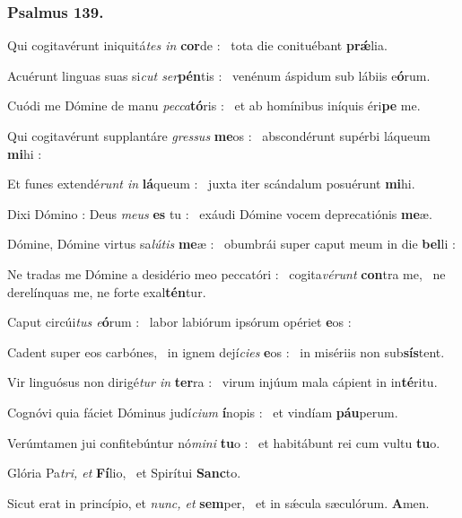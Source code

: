 \documentclass[12pt]{article} %
\def\noinitial{%
\setspaceafterinitial{0pt plus 0em minus 0em}%
\setspacebeforeinitial{0pt plus 0em minus 0em}%
\relax %
}
\newenvironment{psalmtext}{\leftskip 0.25in}{\vspace{2 mm}}
\let\oldgresixstar\gresixstar
\renewcommand{\gresixstar}{\textcolor{benred8}{\oldgresixstar}}
\let\oldgredagger\gredagger
\renewcommand{\gredagger}{\textcolor{benred8}{\oldgredagger}}
\begin{document}
\subsubsection*{Psalmus 139.}

{\noinitial
{}

}

\begin{psalmtext}
Qui cogitavérunt iniquitá\emph{tes in} \textbf{cor}de : \gresixstar\ tota die conituébant \textbf{prǽ}lia.

Acuérunt linguas suas si\emph{cut ser}\textbf{pén}tis : \gresixstar\ venénum áspidum sub lábiis e\textbf{ó}rum.

Cuódi me Dómine de manu \emph{pecca}\textbf{tó}ris : \gresixstar\ et ab homínibus iníquis éri\textbf{pe} me.

Qui cogitavérunt supplantáre \emph{gressus} \textbf{me}os : \gresixstar\ abscondérunt supérbi láqueum \textbf{mi}hi :

Et funes extendé\emph{runt in} \textbf{lá}queum : \gresixstar\ juxta iter scándalum posuérunt \textbf{mi}hi.

Dixi Dómino : Deus \emph{meus} \textbf{es} tu : \gresixstar\ exáudi Dómine vocem deprecatiónis \textbf{me}æ.

Dómine, Dómine virtus sa\emph{lútis} \textbf{me}æ : \gresixstar\ obumbrái super caput meum in die \textbf{bel}li :

Ne tradas me Dómine a desidério meo peccatóri : \gredagger\ cogita\emph{vérunt} \textbf{con}tra me, \gresixstar\ ne derelínquas me, ne forte exal\textbf{tén}tur.

Caput circúi\emph{tus e}\textbf{ó}rum : \gresixstar\ labor labiórum ipsórum opériet \textbf{e}os :

Cadent super eos carbónes, \gredagger\ in ignem dejí\emph{cies} \textbf{e}os : \gresixstar\ in misériis non sub\textbf{sís}tent.

Vir linguósus non dirigé\emph{tur in} \textbf{ter}ra : \gresixstar\ virum injúum mala cápient in in\textbf{té}ritu.

Cognóvi quia fáciet Dóminus judí\emph{cium} \textbf{í}nopis : \gresixstar\ et vindíam \textbf{páu}perum.

Verúmtamen jui confitebúntur nó\emph{mini} \textbf{tu}o : \gresixstar\ et habitábunt rei cum vultu \textbf{tu}o.

Glória Pa\emph{tri, et} \textbf{Fí}lio, \gresixstar\ et Spirítui \textbf{Sanc}to.

Sicut erat in princípio, et \emph{nunc, et} \textbf{sem}per, \gresixstar\ et in sǽcula sæculórum. \textbf{A}men.

\end{psalmtext}
\end{document}
